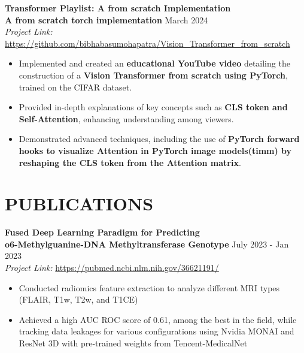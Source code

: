 \documentclass[a4paper,10pt]{extarticle}
\begin{document}
{%
\noindent
\textbf{Transformer Playlist: A from scratch Implementation \\ A from scratch torch implementation } \hfill March 2024 \\ %
\textit{Project Link:} \url{https://github.com/bibhabasumohapatra/Vision_Transformer_from_scratch} 
\begin{itemize}
    \item Implemented and created an \textbf{educational YouTube video} detailing the construction of a \textbf{Vision Transformer from scratch using PyTorch}, trained on the CIFAR dataset.
    \vspace{1.2mm}\item Provided in-depth explanations of key concepts such as \textbf{CLS token and Self-Attention}, enhancing understanding among viewers.
    \vspace{1.2mm}\item Demonstrated advanced techniques, including the use of \textbf{PyTorch forward hooks to visualize Attention in PyTorch image models(timm) by reshaping the CLS token from the Attention matrix}.

    

\end{itemize}
\section*{PUBLICATIONS}
\noindent
\textbf{Fused Deep Learning Paradigm for Predicting \\ o6-Methylguanine-DNA Methyltransferase Genotype} \hfill July 2023 - Jan 2023\\ %
\textit{Project Link:} \url{https://pubmed.ncbi.nlm.nih.gov/36621191/} 
\begin{itemize}
    \item Conducted radiomics feature extraction to analyze different MRI types (FLAIR, T1w, T2w, and T1CE)
    \vspace{1.2mm}\item  Achieved a high AUC ROC score of 0.61, among the best in the field, while tracking data leakages for various configurations using Nvidia MONAI and ResNet 3D with pre-trained weights from Tencent-MedicalNet
\end{itemize}  

     
}
\end{document}
